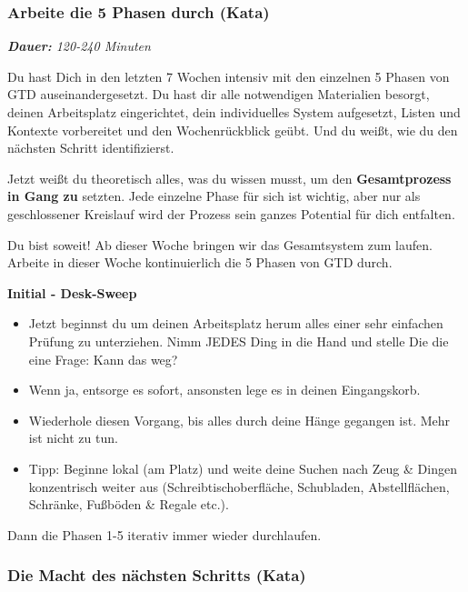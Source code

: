 \documentclass[
  ngerman,
  paper=a4,
,captions=tableheading
]{scrartcl}
\providecommand{\tightlist}{%
  \setlength{\itemsep}{0pt}\setlength{\parskip}{0pt}}
\begin{document}
\hypertarget{arbeite-die-5-phasen-durch-kata}{%
\subsubsection{Arbeite die 5 Phasen durch
(Kata)}\label{arbeite-die-5-phasen-durch-kata}}

\emph{\textbf{Dauer:} 120-240 Minuten}

Du hast Dich in den letzten 7 Wochen intensiv mit den einzelnen 5 Phasen
von GTD auseinandergesetzt. Du hast dir alle notwendigen Materialien
besorgt, deinen Arbeitsplatz eingerichtet, dein individuelles System
aufgesetzt, Listen und Kontexte vorbereitet und den Wochenrückblick
geübt. Und du weißt, wie du den nächsten Schritt identifizierst.

Jetzt weißt du theoretisch alles, was du wissen musst, um den
\textbf{Gesamtprozess in Gang zu} setzten. Jede einzelne Phase für sich
ist wichtig, aber nur als geschlossener Kreislauf wird der Prozess sein
ganzes Potential für dich entfalten.

Du bist soweit! Ab dieser Woche bringen wir das Gesamtsystem zum laufen.
Arbeite in dieser Woche kontinuierlich die 5 Phasen von GTD durch.

\textbf{Initial - Desk-Sweep}

\begin{itemize}
\tightlist
\item
  Jetzt beginnst du um deinen Arbeitsplatz herum alles einer sehr
  einfachen Prüfung zu unterziehen. Nimm JEDES Ding in die Hand und
  stelle Die die eine Frage: Kann das weg?
\item
  Wenn ja, entsorge es sofort, ansonsten lege es in deinen Eingangskorb.
\item
  Wiederhole diesen Vorgang, bis alles durch deine Hänge gegangen ist.
  Mehr ist nicht zu tun.
\item
  Tipp: Beginne lokal (am Platz) und weite deine Suchen nach Zeug \&
  Dingen konzentrisch weiter aus (Schreibtischoberfläche, Schubladen,
  Abstellflächen, Schränke, Fußböden \& Regale etc.).
\end{itemize}

Dann die Phasen 1-5 iterativ immer wieder durchlaufen.

\hypertarget{die-macht-des-nuxe4chsten-schritts-kata}{%
\subsubsection{Die Macht des nächsten Schritts
(Kata)}\label{die-macht-des-nuxe4chsten-schritts-kata}}
\end{document}

